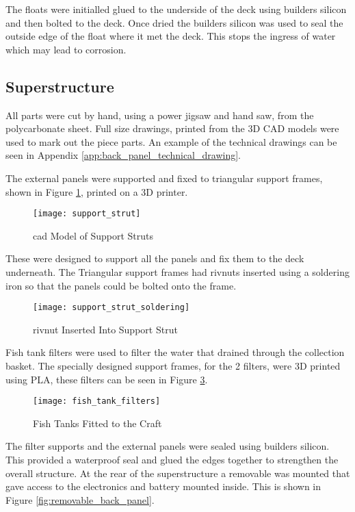 \documentclass [11pt]{article}
\begin{document}
The floats were initialled glued to the underside of the deck using builders silicon and then bolted to the deck. Once dried the builders silicon was used to seal the outside edge of the float where it met the deck. This stops the ingress of water which may lead to corrosion.

\subsection{Superstructure}

All parts were cut by hand, using a power jigsaw and hand saw, from the polycarbonate sheet. Full size drawings, printed from the 3D CAD models were used to mark out the piece parts. An example of the technical drawings can be seen in Appendix \ref{app:back_panel_technical_drawing}.

The external panels were supported and fixed to triangular support frames, shown in Figure \ref{fig:support_strut}, printed on a 3D printer. 

\begin{figure}[H]
\centerline{\texttt{[image: support\_strut]}}
\caption{\gls{cad} Model of Support Struts}
\label{fig:support_strut}
\end{figure}

These were designed to support all the panels and fix them to the deck underneath. The Triangular support frames had \gls{rivnut}s inserted using a soldering iron so that the panels could be bolted onto the frame.

\begin{figure}[H]
\centerline{\texttt{[image: support\_strut\_soldering]}}
\caption{\gls{rivnut} Inserted Into Support Strut}
\label{fig:support_strut_soldering}
\end{figure}

Fish tank filters were used to filter the water that drained through the collection basket. The specially designed support frames, for the 2 filters, were 3D printed using PLA, these filters can be seen in Figure \ref{fig:fish_tank_filters}.

\begin{figure}[H]
\centerline{\texttt{[image: fish\_tank\_filters]}}
\caption{Fish Tanks Fitted to the Craft}
\label{fig:fish_tank_filters}
\end{figure}


The filter supports and the external panels were sealed using builders silicon. This provided a waterproof seal and glued the edges together to strengthen the overall structure.
At the rear of the superstructure a removable was mounted that gave access to the electronics and battery mounted inside. This is shown in Figure \ref{fig:removable_back_panel}.
\end{document}
